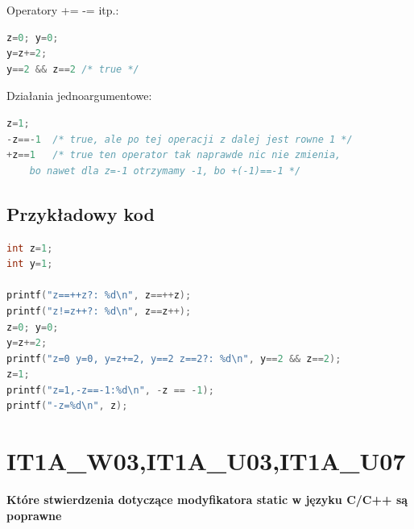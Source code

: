 Operatory += -= itp.:
\begin{lstlisting}[language=c]
z=0; y=0;
y=z+=2;
y==2 && z==2 /* true */
\end{lstlisting}

Działania jednoargumentowe:
\begin{lstlisting}[language=c]
z=1;
-z==-1  /* true, ale po tej operacji z dalej jest rowne 1 */
+z==1   /* true ten operator tak naprawde nic nie zmienia,
	bo nawet dla z=-1 otrzymamy -1, bo +(-1)==-1 */
\end{lstlisting}

\subsection{Przykładowy kod}

\begin{lstlisting}[language=c]
int z=1;
int y=1;

printf("z==++z?: %d\n", z==++z);
printf("z!=z++?: %d\n", z==z++);
z=0; y=0;
y=z+=2;
printf("z=0 y=0, y=z+=2, y==2 z==2?: %d\n", y==2 && z==2);
z=1;
printf("z=1,-z==-1:%d\n", -z == -1);
printf("-z=%d\n", z);
\end{lstlisting}

\section{IT1A\_W03,IT1A\_U03,IT1A\_U07} 
\textbf{Które stwierdzenia dotyczące modyfikatora static w języku C/C++ są poprawne}

